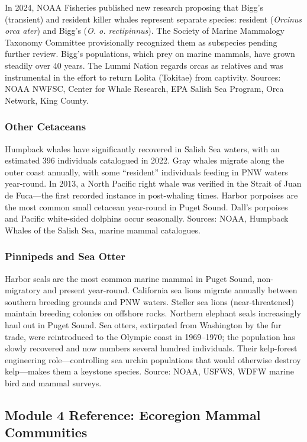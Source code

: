 \documentclass[11pt,letterpaper]{article}
\begin{document}
In 2024, NOAA Fisheries published new research proposing that Bigg's (transient) and resident killer whales represent separate species: resident (\textit{Orcinus orca ater}) and Bigg's (\textit{O. o. rectipinnus}). The Society of Marine Mammalogy Taxonomy Committee provisionally recognized them as subspecies pending further review. Bigg's populations, which prey on marine mammals, have grown steadily over 40 years. The Lummi Nation regards orcas as relatives and was instrumental in the effort to return Lolita (Tokitae) from captivity. Sources: NOAA NWFSC, Center for Whale Research, EPA Salish Sea Program, Orca Network, King County.

\subsubsection{Other Cetaceans}
Humpback whales have significantly recovered in Salish Sea waters, with an estimated 396 individuals catalogued in 2022. Gray whales migrate along the outer coast annually, with some ``resident'' individuals feeding in PNW waters year-round. In 2013, a North Pacific right whale was verified in the Strait of Juan de Fuca---the first recorded instance in post-whaling times. Harbor porpoises are the most common small cetacean year-round in Puget Sound. Dall's porpoises and Pacific white-sided dolphins occur seasonally. Sources: NOAA, Humpback Whales of the Salish Sea, marine mammal catalogues.

\subsubsection{Pinnipeds and Sea Otter}
Harbor seals are the most common marine mammal in Puget Sound, non-migratory and present year-round. California sea lions migrate annually between southern breeding grounds and PNW waters. Steller sea lions (near-threatened) maintain breeding colonies on offshore rocks. Northern elephant seals increasingly haul out in Puget Sound. Sea otters, extirpated from Washington by the fur trade, were reintroduced to the Olympic coast in 1969--1970; the population has slowly recovered and now numbers several hundred individuals. Their kelp-forest engineering role---controlling sea urchin populations that would otherwise destroy kelp---makes them a keystone species. Source: NOAA, USFWS, WDFW marine bird and mammal surveys.

\subsection{Module 4 Reference: Ecoregion Mammal Communities}
\end{document}

